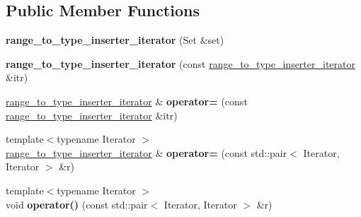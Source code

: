 \subsection*{Public Member Functions}
\begin{DoxyCompactItemize}
\item 
\hypertarget{classstrtk_1_1range__to__type__inserter__iterator_a28b9082fd9dea5b50b6995a8b11443df}{{\bfseries range\-\_\-to\-\_\-type\-\_\-inserter\-\_\-iterator} (Set \&set)}\label{classstrtk_1_1range__to__type__inserter__iterator_a28b9082fd9dea5b50b6995a8b11443df}

\item 
\hypertarget{classstrtk_1_1range__to__type__inserter__iterator_a77d490fec4aaf2a8c7dcca6f616aa7a2}{{\bfseries range\-\_\-to\-\_\-type\-\_\-inserter\-\_\-iterator} (const \hyperlink{classstrtk_1_1range__to__type__inserter__iterator}{range\-\_\-to\-\_\-type\-\_\-inserter\-\_\-iterator} \&itr)}\label{classstrtk_1_1range__to__type__inserter__iterator_a77d490fec4aaf2a8c7dcca6f616aa7a2}

\item 
\hypertarget{classstrtk_1_1range__to__type__inserter__iterator_a1efd479fd8afde7719eb540d11ead4ef}{\hyperlink{classstrtk_1_1range__to__type__inserter__iterator}{range\-\_\-to\-\_\-type\-\_\-inserter\-\_\-iterator} \& {\bfseries operator=} (const \hyperlink{classstrtk_1_1range__to__type__inserter__iterator}{range\-\_\-to\-\_\-type\-\_\-inserter\-\_\-iterator} \&itr)}\label{classstrtk_1_1range__to__type__inserter__iterator_a1efd479fd8afde7719eb540d11ead4ef}

\item 
\hypertarget{classstrtk_1_1range__to__type__inserter__iterator_a9c27a185f87ddc65f4315738fe65d417}{{\footnotesize template$<$typename Iterator $>$ }\\\hyperlink{classstrtk_1_1range__to__type__inserter__iterator}{range\-\_\-to\-\_\-type\-\_\-inserter\-\_\-iterator} \& {\bfseries operator=} (const std\-::pair$<$ Iterator, Iterator $>$ \&r)}\label{classstrtk_1_1range__to__type__inserter__iterator_a9c27a185f87ddc65f4315738fe65d417}

\item 
\hypertarget{classstrtk_1_1range__to__type__inserter__iterator_a1041f2cf6360a6e551507e40ec56fae3}{{\footnotesize template$<$typename Iterator $>$ }\\void {\bfseries operator()} (const std\-::pair$<$ Iterator, Iterator $>$ \&r)}\label{classstrtk_1_1range__to__type__inserter__iterator_a1041f2cf6360a6e551507e40ec56fae3}


\end{DoxyCompactItemize}
